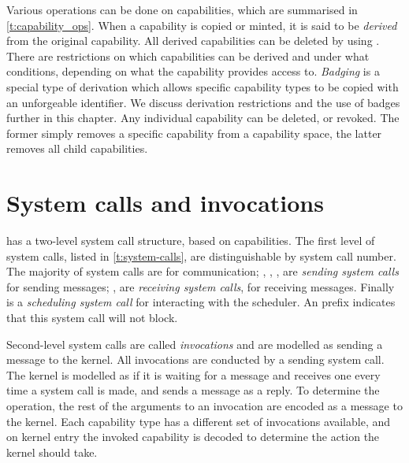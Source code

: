 Various operations can be done on capabilities, which are summarised in \cref{t:capability_ops}.
When a capability is copied or minted, it is said to be \emph{derived} from the original capability.
All derived capabilities can be deleted by using \cnoderevoke.
There are restrictions on which capabilities can be derived and under what conditions, depending on
what the capability provides access to. 
\emph{Badging} is a special type of derivation which allows specific capability types to be copied
with an unforgeable identifier. We discuss derivation restrictions and the use of badges further
in this chapter.
Any individual capability can be deleted, or revoked. The former simply removes a specific
capability from a capability space, the latter removes all child capabilities.

\section{System calls and invocations}
\label{sec:sel4-system-call-and-invocations}

\selfour has a two-level system call structure, based on capabilities. The first level of system
calls, listed in \cref{t:system-calls}, are distinguishable by system call number.  The majority of
system calls are for communication; \send, \nbsend, \call, \reply are \emph{sending system calls}
for sending messages; \recv, \nbrecv are \emph{receiving system calls}, for receiving messages.
Finally \yield is a \emph{scheduling system call} for interacting with the scheduler.
An  prefix indicates that this system call will not block.

Second-level system calls are called \emph{invocations} and are modelled as sending a message
to the kernel. All invocations are conducted by a sending system call. The kernel is modelled as if
it is waiting for a message and receives one every time a system call is made, and sends a message
as a reply. 
To determine the operation, the rest of the arguments to an invocation are encoded as a message to
the kernel. Each capability type has a different set of invocations available, and on kernel entry 
 the invoked capability is decoded to determine the action the kernel should take. 

